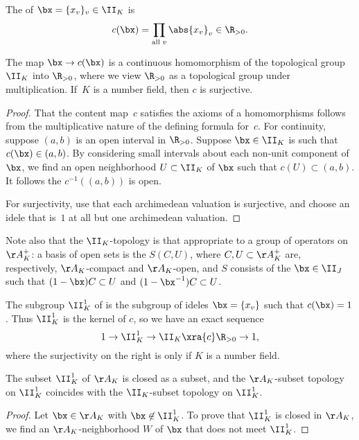 \documentclass[11pt]{book}
\begin{document}
\begin{ch}
\begin{definition}
The  of $\bx=\{x_v\}_v \in \II_K$ is
$$
  c(\bx) = \prod_{\text{all }v} \abs{x_v}_v \in \R_{>0}.
$$
\end{definition}

\begin{lemma}
The map $\bx\to c(\bx)$ is a continuous  homomorphism of
the topological group $\II_K$ into $\R_{>0}$, where
we view $\R_{>0}$ as a topological group under multiplication.
If~$K$ is a number field, then $c$ is surjective.
\end{lemma}
\begin{proof}
That the content map~$c$ satisfies the axioms of a homomorphisms
follows from the multiplicative nature of the defining formula
for~$c$.  For continuity, suppose $(a,b)$ is an open interval
in $\R_{>0}$.  Suppose $\bx\in\II_K$ is such that $c(\bx)\in (a,b)$.
By considering small intervals about each non-unit component of
$\bx$, we find an open neighborhood $U\subset \II_K$ of $\bx$
such that $c(U)\subset (a,b)$.  It follows the $c^{-1}((a,b))$
is open.

For surjectivity, use that each archimedean valuation is surjective,
and choose an idele that is~$1$ at all but one archimedean valuation.
\end{proof}
\begin{remark}
Note also that the $\II_K$-topology is that appropriate to a
group of operators on $\AA_K^+$: a basis of open sets
is the $S(C,U)$, where $C,U\subset \AA_K^+$
are, respectively, $\AA_K$-compact and $\AA_K$-open, and
$S$ consists of the $\bx\in \II_J$ such that
$(1-\bx) C\subset U$ and
$(1-\bx^{-1}) C\subset U$.
\end{remark}

\begin{definition}[$1$-Ideles]
  The subgroup $\II_K^1$ of  is the subgroup of ideles
  $\bx=\{x_v\}$ such that $c(\bx)=1$.  Thus $\II_K^1$
is the kernel of $c$, so we have an exact sequence
$$
1 \to \II_K^1 \to \II_K \xra{c} \R_{>0}\to 1,
$$
where the surjectivity on the right is only if $K$
is a number field.
\end{definition}

\begin{lemma}
The subset $\II_K^1$ of $\AA_K$ is closed as a subset,
and the $\AA_K$-subset topology on $\II_K^1$ coincides
with the $\II_K$-subset topology on $\II_K^1$.
\end{lemma}
\begin{proof}
  Let $\bx\in\AA_K$ with $\bx\not\in\II_K^1$. To prove that $\II_K^1$
  is closed in $\AA_K$, we find an $\AA_K$-neighborhood $W$ of $\bx$
  that does not meet $\II_K^1$.


\end{proof}
\end{ch}
\end{document}
